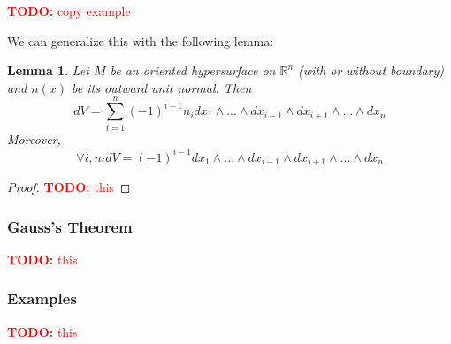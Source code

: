\documentclass{article}
\newtheorem{lemma}{Lemma}
\newcommand{\reals}[0]{\mathbb{R}}
\newcommand{\TODO}[1]{\textcolor{red}{\textbf{TODO:} #1}}
\begin{document}
\TODO{copy example}

We can generalize this with the following lemma:
\begin{lemma}
  Let \(M\) be an oriented hypersurface on \(\reals^n\) (with or without boundary) and \(n(x)\) be its outward unit normal. Then
  \begin{equation}
    dV = \sum_{i = 1}^n(-1)^{i - 1}n_i dx_1 \wedge ... \wedge dx_{i - 1} \wedge dx_{i + 1} \wedge ... \wedge dx_n
  \end{equation}
  Moreover,
  \begin{equation}
    \forall i, n_idV = (-1)^{i - 1}dx_1 \wedge ... \wedge dx_{i - 1} \wedge dx_{i + 1} \wedge ... \wedge dx_n
  \end{equation}
\end{lemma}
\begin{proof}
  \TODO{this}
\end{proof}

\subsubsection{Gauss's Theorem}

\TODO{this}

\subsubsection{Examples}

\TODO{this}
\end{document}

